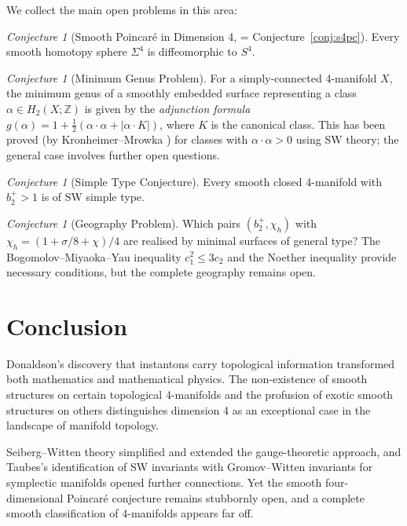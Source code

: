 \documentclass[12pt,a4paper]{amsart}
\theoremstyle{definition}
\theoremstyle{remark}
\newtheorem{conjecture}[theorem]{Conjecture}
\newcommand{\ZZ}{\mathbb{Z}}
\begin{document}
We collect the main open problems in this area:

\begin{conjecture}[Smooth Poincaré in Dimension 4, = Conjecture~\ref{conj:s4pc}]
Every smooth homotopy sphere $\Sigma^4$ is diffeomorphic to $S^4$.
\end{conjecture}

\begin{conjecture}[Minimum Genus Problem]
For a simply-connected 4-manifold $X$, the minimum genus of a smoothly
embedded surface representing a class $\alpha \in H_2(X;\ZZ)$ is given by
the \emph{adjunction formula}
$g(\alpha) = 1 + \tfrac{1}{2}(\alpha \cdot \alpha + |\alpha \cdot K|)$,
where $K$ is the canonical class.  This has been proved (by Kronheimer--Mrowka
\cite{KronheimerMrowka1994}) for classes with $\alpha \cdot \alpha > 0$
using SW theory; the general case involves further open questions.
\end{conjecture}

\begin{conjecture}[Simple Type Conjecture]
Every smooth closed 4-manifold with $b_2^+ > 1$ is of SW simple type.
\end{conjecture}

\begin{conjecture}[Geography Problem]
Which pairs $(b_2^+, \chi_h)$ with $\chi_h = (1 + \sigma/8 + \chi)/4$ are
realised by minimal surfaces of general type?  The Bogomolov--Miyaoka--Yau
inequality $c_1^2 \le 3c_2$ and the Noether inequality provide necessary
conditions, but the complete geography remains open.
\end{conjecture}

\section{Conclusion}

Donaldson's discovery that instantons carry topological information
transformed both mathematics and mathematical physics.  The non-existence of
smooth structures on certain topological 4-manifolds and the profusion of
exotic smooth structures on others distinguishes dimension 4 as an
exceptional case in the landscape of manifold topology.

Seiberg--Witten theory simplified and extended the gauge-theoretic approach,
and Taubes's identification of SW invariants with Gromov--Witten invariants
for symplectic manifolds opened further connections.  Yet the smooth
four-dimensional Poincaré conjecture remains stubbornly open, and a complete
smooth classification of 4-manifolds appears far off.
\end{document}
